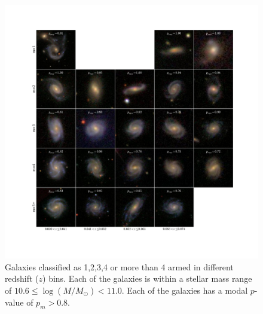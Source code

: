\documentclass[useAMS,usenatbib]{mn2e}
\begin{document}
\begin{figure}
		\centering

        \includegraphics[width=1\textwidth]{Images/Results/image_page_p0810_m106110.pdf}

        \caption{Galaxies classified as 1,2,3,4 or more than 4 armed in different redshift ($z$) bins. Each of the galaxies is within a stellar mass range of $10.6 \leq \log(M/M_{\odot}) < 11.0$. Each of the galaxies has a modal $p$-value of $p_m > 0.8$.}

        \label{fig:image_panel_secure}

\end{figure}
\end{document}
